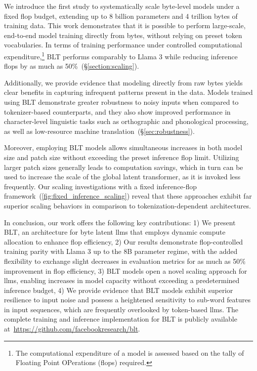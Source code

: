 We introduce the first study to systematically scale byte-level models under a fixed flop budget, extending up to 8 billion parameters and 4 trillion bytes of training data. This work demonstrates that it is possible to perform large-scale, end-to-end model training directly from bytes, without relying on preset token vocabularies. In terms of training performance under controlled computational expenditure,\footnote{The computational expenditure of a model is assessed based on the tally of Floating Point OPerations (flops) required.} {\textsc BLT} performs comparably to Llama 3 while reducing inference flops by as much as 50\%~(\S\ref{section:scaling}).

Additionally, we provide evidence that modeling directly from raw bytes yields clear benefits in capturing infrequent patterns present in the data. Models trained using {\textsc BLT} demonstrate greater robustness to noisy inputs when compared to tokenizer-based counterparts, and they also show improved performance in character-level linguistic tasks such as orthographic and phonological processing, as well as low-resource machine translation~(\S\ref{sec:robustness}).

Moreover, employing {\textsc BLT} models allows simultaneous increases in both model size and patch size without exceeding the preset inference flop limit. Utilizing larger patch sizes generally leads to computation savings, which in turn can be used to increase the scale of the global latent transformer, as it is invoked less frequently. Our scaling investigations with a fixed inference-flop framework~(\autoref{fig:fixed_inference_scaling}) reveal that these approaches exhibit far superior scaling behaviors in comparison to tokenization-dependent architectures.

In conclusion, our work offers the following key contributions: 1) We present {\textsc BLT}, an architecture for byte latent llms that employs dynamic compute allocation to enhance flop efficiency, 2) Our results demonstrate flop-controlled training parity with Llama 3 up to the 8B parameter regime, with the added flexibility to exchange slight decreases in evaluation metrics for as much as 50\% improvement in flop efficiency, 3) {\textsc BLT} models open a novel scaling approach for llms, enabling increases in model capacity without exceeding a predetermined inference budget, 4) We provide evidence that {\textsc BLT} models exhibit superior resilience to input noise and possess a heightened sensitivity to sub-word features in input sequences, which are frequently overlooked by token-based llms. The complete training and inference implementation for {\textsc BLT} is publicly available at~\url{https://github.com/facebookresearch/blt}.

